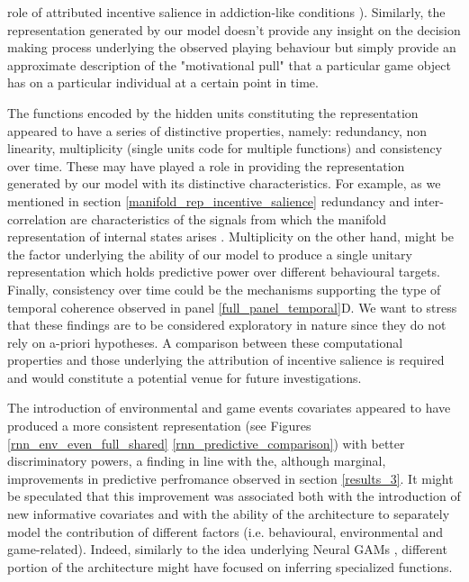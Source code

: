 role of attributed incentive salience in addiction-like conditions \cite{robinson1993neural}). Similarly, the representation generated by our model doesn't provide any insight on the decision making process underlying the observed playing behaviour but simply provide an approximate description of the "motivational pull" that a particular game object has on a particular individual at a certain point in time. 

The functions encoded by the hidden units constituting the representation appeared to have a series of distinctive properties, namely: redundancy, non linearity, multiplicity (single units code for multiple functions) and consistency over time. These may have played a role in providing the representation generated by our model with its distinctive characteristics. For example, as we mentioned in section \ref{manifold_rep_incentive_salience} redundancy and inter-correlation are characteristics of the signals from which the manifold representation of internal states arises \cite{seung2000manifold,gallego2017neural}. Multiplicity on the other hand, might be the factor underlying the ability of our model to produce a single unitary representation which holds predictive power over different behavioural targets. Finally, consistency over time could be the mechanisms supporting the type of temporal coherence observed in panel \ref{full_panel_temporal}D. We want to stress that these findings are to be considered exploratory in nature since they do not rely on a-priori hypotheses. A comparison between these computational properties and those underlying the attribution of incentive salience is required and would constitute a potential venue for future investigations. 

The introduction of environmental and game events covariates appeared to have produced a more consistent representation (see Figures \ref{rnn_env_even_full_shared} \ref{rnn_predictive_comparison}) with better discriminatory powers, a finding in line with the, although marginal, improvements in predictive perfromance observed in section \ref{results_3}. It might be speculated that this improvement was associated both with the introduction of new informative covariates and with the ability of the architecture to separately model the contribution of different factors (i.e. behavioural, environmental and game-related). Indeed, similarly to the idea underlying Neural GAMs \cite{agarwal2021neural}, different portion of the architecture might have focused on inferring specialized functions. 


